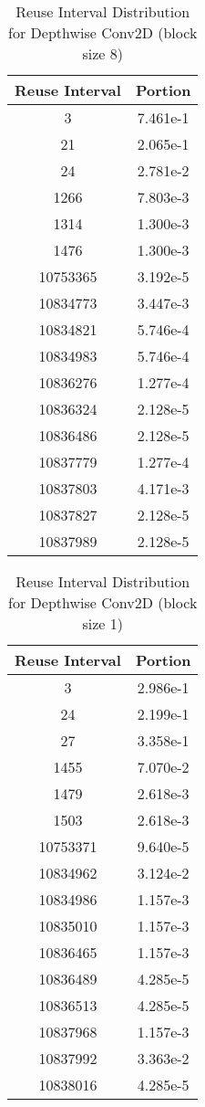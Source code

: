 \documentclass[conference]{article}
\begin{document}
\begin{table}[H]
\centering
\begin{tabular}{|c|c|}
    \hline
    Reuse Interval & Portion \\ 
    \hline
    3 & 7.461e-1 \\ 
    21 & 2.065e-1 \\ 
    24 & 2.781e-2 \\ 
    1266 & 7.803e-3 \\ 
    1314 & 1.300e-3 \\ 
    1476 & 1.300e-3 \\ 
    10753365 & 3.192e-5 \\ 
    10834773 & 3.447e-3 \\ 
    10834821 & 5.746e-4 \\ 
    10834983 & 5.746e-4 \\ 
    10836276 & 1.277e-4 \\ 
    10836324 & 2.128e-5 \\ 
    10836486 & 2.128e-5 \\ 
    10837779 & 1.277e-4 \\ 
    10837803 & 4.171e-3 \\ 
    10837827 & 2.128e-5 \\ 
    10837989 & 2.128e-5 \\ 
    \hline
\end{tabular}
\caption{Reuse Interval Distribution for Depthwise Conv2D (block size 8)}
\end{table}

\begin{table}[H]
\centering
\begin{tabular}{|c|c|}
    \hline
    Reuse Interval & Portion \\ 
    \hline
    3 & 2.986e-1 \\ 
    24 & 2.199e-1 \\ 
    27 & 3.358e-1 \\ 
    1455 & 7.070e-2 \\ 
    1479 & 2.618e-3 \\ 
    1503 & 2.618e-3 \\ 
    10753371 & 9.640e-5 \\ 
    10834962 & 3.124e-2 \\ 
    10834986 & 1.157e-3 \\ 
    10835010 & 1.157e-3 \\ 
    10836465 & 1.157e-3 \\ 
    10836489 & 4.285e-5 \\ 
    10836513 & 4.285e-5 \\ 
    10837968 & 1.157e-3 \\ 
    10837992 & 3.363e-2 \\ 
    10838016 & 4.285e-5 \\ 
    \hline
\end{tabular}
\caption{Reuse Interval Distribution for Depthwise Conv2D (block size 1)}
\end{table}
\end{document}
